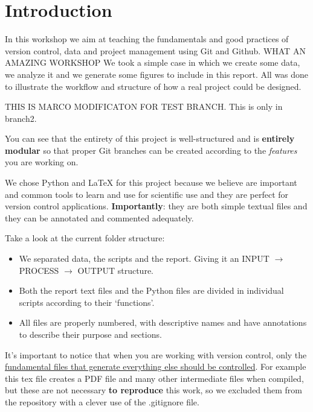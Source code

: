 \section{Introduction}

In this workshop we aim at teaching the fundamentals and good practices of version control, data and project management using Git and Github. WHAT AN AMAZING WORKSHOP We took a simple case in which we create some data, we analyze it and we generate some figures to include in this report. All was done to illustrate the workflow and structure of how a real project could be designed.

THIS IS MARCO MODIFICATON FOR TEST BRANCH. This is only in branch2.

You can see that the entirety of this project is well-structured and is \textbf{entirely modular} so that proper Git branches can be created according to the \textit{features} you are working on.

We chose Python and \LaTeX\xspace for this project because we believe are important and common tools to learn and use for scientific use and they are perfect for version control applications. \textbf{Importantly}: they are both simple textual files and they can be annotated and commented adequately.

Take a look at the current folder structure:

\begin{itemize}
    \item We separated data, the scripts and the report. Giving it an INPUT $\rightarrow$ PROCESS $\rightarrow$ OUTPUT structure.
    \item Both the report text files and the Python files are divided in individual scripts according to their `functions'.
    \item All files are properly numbered, with descriptive names and have annotations to describe their purpose and sections.
\end{itemize}

It's important to notice that when you are working with version control, only the \underline{fundamental files that generate everything else should be controlled}. For example this tex file creates a PDF file and many other intermediate files when compiled, but these are not necessary \textbf{to reproduce} this work, so we excluded them from the repository with a clever use of the .gitignore file.